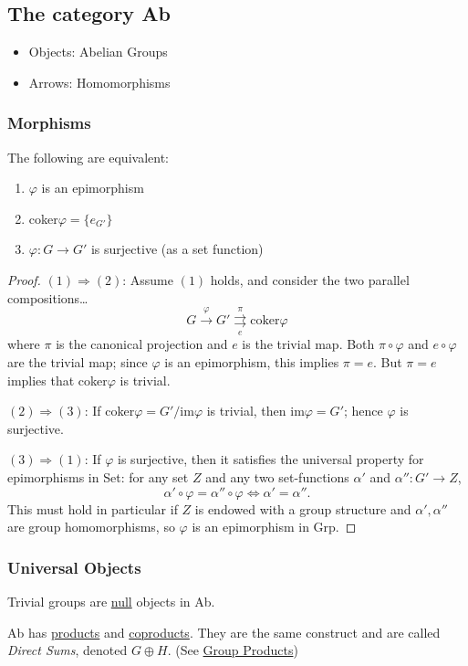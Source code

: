 \subsection{The category Ab}
\begin{itemize}
  \item Objects: Abelian Groups
  \item Arrows: Homomorphisms
\end{itemize}

\subsubsection{Morphisms}

\begin{proposition}
The following are equivalent:
\begin{enumerate}
  \item $\varphi$ is an epimorphism
  \item coker$\varphi = \{ e_{G'} \}$
  \item $\varphi : G \rightarrow G'$ is surjective (as a set function)
\end{enumerate}
\end{proposition}

\begin{proof}
$(1) \Rightarrow (2)$: Assume $(1)$ holds, and consider the two parallel compositions\dots
$$G \xrightarrow[]{\varphi} G' \underset{e}{\overset{\pi}{\rightrightarrows}} \textrm{coker} \varphi$$
where $\pi$ is the canonical projection and $e$ is the trivial map. Both $\pi \circ \varphi$ and $e \circ \varphi$ are the trivial map; since $\varphi$ is an epimorphism,
this implies $\pi = e$. But $\pi = e$ implies that coker$\varphi$ is trivial.

\noindent $(2) \Rightarrow (3)$: If coker$\varphi = G' / \textrm{im}\varphi$ is trivial, then im$\varphi = G'$; hence $\varphi$ is surjective.

\noindent $(3) \Rightarrow (1)$: If $\varphi$ is surjective, then it satisfies the universal property for epimorphisms in Set: for any set $Z$ and any two set-functions $\alpha'$ and
$\alpha'' : G' \rightarrow Z$,
$$\alpha' \circ \varphi = \alpha'' \circ \varphi \Leftrightarrow \alpha' = \alpha''.$$
This must hold in particular if $Z$ is endowed with a group structure and $\alpha',\alpha''$ are group homomorphisms, so $\varphi$ is an epimorphism in Grp.
\end{proof}

\subsubsection{Universal Objects}

\begin{proposition}
Trivial groups are \hyperref[null]{null} objects in Ab.
\end{proposition}

\begin{proposition}
Ab has \hyperref[products]{products} and \hyperref[coproducts]{coproducts}. They are the same
construct and are called \emph{Direct Sums}, denoted $G \oplus H$. (See \hyperref[groupproduct]{Group Products})
\end{proposition}